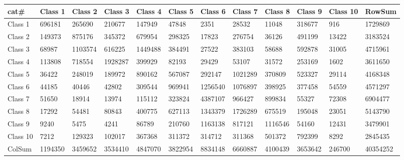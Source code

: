 \begin{table}[!ht]
    \centering
    \begin{tabular}{|l|l|l|l|l|l|l|l|l|l|l|l|}
    \hline
        \textbf{cat\#} & \textbf{Class 1} & \textbf{Class 2} & \textbf{Class 3} & \textbf{Class 4} & \textbf{Class 5} & \textbf{Class 6} & \textbf{Class 7} & \textbf{Class 8} & \textbf{Class 9} & \textbf{Class 10} & \textbf{RowSum} \\ \hline
        Class 1 & 696181 & 265690 & 210677 & 147949 & 47848 & 2351 & 28532 & 11048 & 318677 & 916 & 1729869 \\ \hline
        Class 2 & 149373 & 875176 & 345372 & 679954 & 298325 & 17823 & 276754 & 36126 & 491199 & 13422 & 3183524 \\ \hline
        Class 3 & 68987 & 1103574 & 616225 & 1449488 & 384491 & 27522 & 383103 & 58688 & 592878 & 31005 & 4715961 \\ \hline
        Class 4 & 113808 & 718554 & 1928287 & 399929 & 82193 & 29429 & 53107 & 31572 & 253169 & 1602 & 3611650 \\ \hline
        Class 5 & 36422 & 248019 & 189972 & 890162 & 567087 & 292147 & 1021289 & 370809 & 523327 & 29114 & 4168348 \\ \hline
        Class 6 & 44185 & 40446 & 42802 & 309544 & 969941 & 1256540 & 1076897 & 398925 & 377458 & 54559 & 4571297 \\ \hline
        Class 7 & 51650 & 18914 & 13974 & 115112 & 323824 & 4387107 & 966427 & 899834 & 55327 & 72308 & 6904477 \\ \hline
        Class 8 & 17292 & 54481 & 80843 & 400775 & 627113 & 1343379 & 1726289 & 675519 & 195048 & 23051 & 5143790 \\ \hline
        Class 9 & 9240 & 5475 & 4241 & 86789 & 210760 & 1163138 & 817121 & 1116546 & 54160 & 12431 & 3479901 \\ \hline
        Class 10 & 7212 & 129323 & 102017 & 367368 & 311372 & 314712 & 311368 & 501372 & 792399 & 8292 & 2845435 \\ \hline
        ColSum & 1194350 & 3459652 & 3534410 & 4847070 & 3822954 & 8834148 & 6660887 & 4100439 & 3653642 & 246700 & 40354252 \\ \hline
    \end{tabular}
\end{table}